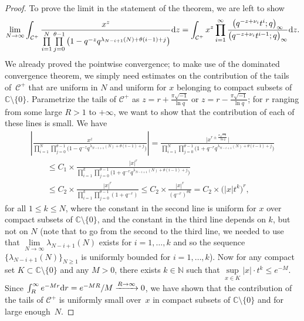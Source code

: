 \documentclass[pdftex]{sigma}
\numberwithin{equation}{section}
\newcommand{\C}{\mathbb{C}}
\newcommand{\N}{\mathbb{N}}
\newcommand{\CC}{\mathcal{C}}
\begin{document}
\begin{proof}
To prove the limit in the statement of the theorem, we are left to show
\begin{gather*}
\lim_{N\rightarrow\infty}{\int_{\CC^+}\frac{x^z}{\prod\limits_{i=1}^N\prod\limits_{j=0}^{\theta-1}{\big(1 - q^{-z}q^{\lambda_{N-i+1}(N) + \theta(i-1)+j}\big)}}{\rm d}z} = \int_{\CC^+}{x^z \prod_{i=1}^{\infty}{\frac{\big(q^{-z+\nu_i}t^i; q\big)_{\infty}}{\big(q^{-z+\nu_i}t^{i-1}; q\big)_{\infty}}} {\rm d}z}.
\end{gather*}
We already proved the pointwise convergence; to make use of the dominated convergence theorem, we simply need estimates on the contribution of the tails of~$\CC^+$ that are uniform in $N$ and uniform for $x$ belonging to compact subsets of $\C\setminus\{0\}$. Parametrize the tails of $\CC^+$ as $z = r + \frac{\pi\sqrt{-1}}{\ln{q}}$ or $z = r - \frac{\pi\sqrt{-1}}{\ln{q}}$; for $r$ ranging from some large $R > 1$ to $+\infty$, we want to show that the contribution of each of these lines is small. We have
\begin{gather*}
\left| \frac{x^z}{\prod\limits_{i=1}^N\prod\limits_{j=0}^{\theta-1}{\big(1 - q^{-z}q^{\lambda_{N-i+1}(N) + \theta(i-1)+j}\big)}} \right| = \frac{\big|x^{r \pm \frac{\pi\sqrt{-1}}{\ln{q}}} \big|}{\prod\limits_{i=1}^N\prod\limits_{j=0}^{\theta-1}{\big(1 + q^{-r}q^{\lambda_{N-i+1}(N) + \theta(i-1)+j}\big)}}\\
\qquad{} \leq C_1\times \frac{|x|^r}{\prod\limits_{i=1}^k\prod\limits_{j=0}^{\theta-1}{\big(1 + q^{-r}q^{\lambda_{N-i+1}(N) + \theta(i-1)+j}\big)}}\\
\qquad{} \leq C_2 \times \frac{|x|^r}{\prod\limits_{i=1}^k\prod\limits_{j=0}^{\theta-1}{(1 + q^{-r})}} \leq C_2 \times \frac{|x|^r}{(q^{-r})^{\theta k}} = C_2 \times \big( |x| t^k \big)^r,
\end{gather*}
for all $1\leq k \leq N$, where the constant in the second line is uniform for $x$ over compact subsets of $\C\setminus\{0\}$, and the constant in the third line depends on $k$, but not on $N$ (note that to go from the second to the third line, we needed to use that $\lim\limits_{N\rightarrow\infty}{\lambda_{N-i+1}(N)}$ exists for $i = 1, \dots, k$ and so the sequence $\{\lambda_{N-i+1}(N)\}_{N\geq 1}$ is uniformly bounded for $i = 1, \dots, k$). Now for any compact set $K\subset\C\setminus\{0\}$ and any $M>0$, there exists $k\in\N$ such that $\sup\limits_{x\in K}{|x|}\cdot t^k \leq e^{-M}$. Since $\int_R^{\infty}{e^{-Mr}{\rm d}r} = e^{-MR}/M \xrightarrow{R\rightarrow\infty} 0$, we have shown that the contribution of the tails of $\CC^+$ is uniformly small over~$x$ in compact subsets of $\C\setminus\{0\}$ and for large enough~$N$.


\end{proof}
\end{document}
